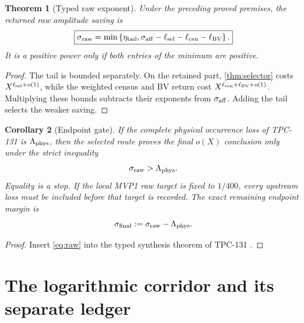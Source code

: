 \documentclass[11pt]{article}
\newtheorem{theorem}{Theorem}[section]
\newtheorem{corollary}[theorem]{Corollary}
\theoremstyle{definition}
\theoremstyle{remark}
\begin{document}
\begin{theorem}[Typed raw exponent]
\label{thm:raw}
Under the preceding proved premises, the returned raw amplitude
saving is
\begin{equation}
\boxed{
 \sigma_{\rm raw}
 =
 \min\left\{
 \eta_{\rm tail},
 \sigma_{\rm aff}
 -\ell_{\rm sel}
 -\ell_{\rm cen}
 -\ell_{\rm BV}
 \right\}.}
\label{eq:raw}
\end{equation}
It is a positive power only if both entries of the minimum are
positive.
\end{theorem}

\begin{proof}
The tail is bounded separately.  On the retained part,
\cref{thm:selector} costs \(X^{\ell_{\rm sel}+o(1)}\), while the
weighted census and BV return cost
\(X^{\ell_{\rm cen}+\ell_{\rm BV}+o(1)}\).  Multiplying these bounds
subtracts their exponents from \(\sigma_{\rm aff}\).  Adding the
tail selects the weaker saving.
\end{proof}

\begin{corollary}[Endpoint gate]
\label{cor:endpoint}
If the complete physical occurrence loss of TPC-131 is
\(\Lambda_{\rm phys}\), then the selected route proves the final
\(o(X)\) conclusion only under the strict inequality
\begin{equation}
 \sigma_{\rm raw}>\Lambda_{\rm phys}.
\label{eq:endpoint}
\end{equation}
Equality is a stop.  If the local MVP1 raw target is fixed to
\(1/400\), every upstream loss must be included before that target
is recorded.  The exact remaining endpoint margin is
\[
 \sigma_{\rm final}
 :=
 \sigma_{\rm raw}-\Lambda_{\rm phys}.
\]
\end{corollary}

\begin{proof}
Insert \eqref{eq:raw} into the typed synthesis theorem of TPC-131
\citep{WangTPC131}.
\end{proof}

\section{The logarithmic corridor and its separate ledger}
\end{document}
